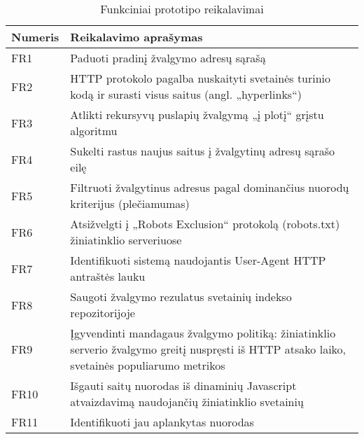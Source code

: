 \begin{table}[htbp]
  \centering
  \caption{Funkciniai prototipo reikalavimai}
    \begin{tabular}{|l|p{23.785em}|}
    \hline
    \textbf{Numeris} & \multicolumn{1}{l|}{\textbf{Reikalavimo aprašymas}} \bigstrut\\
    \hline
    FR1   & Paduoti pradinį žvalgymo adresų sąrašą \bigstrut\\
    \hline
    FR2   & HTTP protokolo pagalba nuskaityti svetainės turinio kodą ir surasti visus saitus (angl. „hyperlinks“) \bigstrut\\
    \hline
    FR3   & Atlikti rekursyvų puslapių žvalgymą „į plotį“ grįstu algoritmu \bigstrut\\
    \hline
    FR4   & Sukelti rastus naujus saitus į žvalgytinų adresų sąrašo eilę \bigstrut\\
    \hline
    FR5   & Filtruoti žvalgytinus adresus pagal dominančius nuorodų kriterijus (plečiamumas) \bigstrut\\
    \hline
    FR6   & Atsižvelgti į „Robots Exclusion“ protokolą (robots.txt) žiniatinklio serveriuose \bigstrut\\
    \hline
    FR7   & Identifikuoti sistemą naudojantis User-Agent HTTP antraštės lauku \bigstrut\\
    \hline
    FR8   & Saugoti žvalgymo rezulatus svetainių indekso repozitorijoje \bigstrut\\
    \hline
    FR9   & Įgyvendinti mandagaus žvalgymo politiką: žiniatinklio serverio žvalgymo greitį nuspręsti iš HTTP atsako laiko, svetainės populiarumo metrikos \bigstrut\\
    \hline
    FR10  & Išgauti saitų nuorodas iš dinaminių Javascript atvaizdavimą naudojančių žiniatinklio svetainių \bigstrut\\
    \hline
    FR11  & Identifikuoti jau aplankytas nuorodas \bigstrut\\
    \hline
    \end{tabular}%
  \label{tab:functional_requirements}%
\end{table}%
